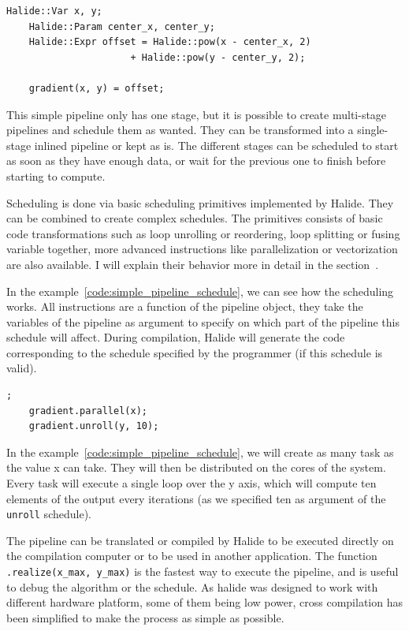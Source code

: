 \lstset{basicstyle=\ttfamily\footnotesize,breaklines=true,tabsize=2}
\begin{lstlisting}[caption={Simple Pipeline Example}, captionpos=b, label={code:simple_pipeline}]
	Halide::Var x, y;
	Halide::Param center_x, center_y;
	Halide::Expr offset = Halide::pow(x - center_x, 2) 
                      + Halide::pow(y - center_y, 2);

	gradient(x, y) = offset;
\end{lstlisting}


	This simple pipeline only has one stage, but it is possible to create multi-stage pipelines and schedule them as wanted. They can be transformed into a single-stage inlined pipeline or kept as is.
	The different stages can be scheduled to start as soon as they have enough data, or wait for the previous one to finish before starting to compute.

	Scheduling is done via basic scheduling primitives implemented by Halide.
They can be combined to create complex schedules. The primitives consists of basic code transformations such as loop unrolling or reordering, loop splitting or fusing variable together, more advanced instructions like parallelization or vectorization are also available. I will explain their behavior more in detail in the section~.


	In the example~\ref{code:simple_pipeline_schedule}, we can see how the scheduling works. All instructions are a function of the pipeline object, they take the variables of the pipeline as argument to specify on which part of the pipeline this schedule will affect. During compilation, Halide will generate the code corresponding to the schedule specified by the programmer (if this schedule is valid).

	\begin{lstlisting}[caption={Simple Pipeline Example}, captionpos=b,label={code:simple_pipeline_schedule}];
	gradient.parallel(x);
	gradient.unroll(y, 10);
	\end{lstlisting}

	In the example~\ref{code:simple_pipeline_schedule}, we will create as many task as the value x can take. They will then be distributed on the cores of the system. Every task will execute a single loop over the y axis, which will compute ten elements of the output every iterations (as we specified ten as argument of the \verb|unroll| schedule).

	The pipeline can be translated or compiled by Halide to be executed directly on the compilation computer or to be used in another application.
	The function \verb|.realize(x_max, y_max)| is the fastest way to execute the  pipeline, and is useful to debug the algorithm or the schedule. As halide was designed to work with different hardware platform, some of them being low power, cross compilation has been simplified to make the process as simple as possible.
	
